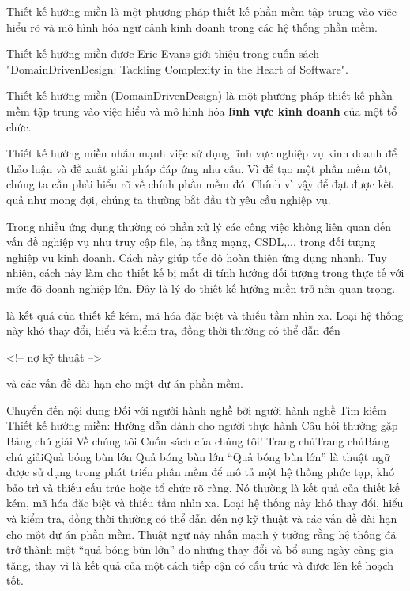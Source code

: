 Thiết kế hướng miền là một phương pháp thiết kế phần mềm tập trung vào việc hiểu rõ và mô hình hóa ngữ cảnh kinh doanh trong các hệ thống phần mềm.

Thiết kế hướng miền được Eric Evans giới thiệu trong cuốn sách "DomainDrivenDesign: Tackling Complexity in the Heart of Software".

Thiết kế hướng miền (DomainDrivenDesign) là một phương pháp thiết kế phần mềm tập trung vào việc hiểu và mô hình hóa \textbf{lĩnh vực kinh doanh} của một tổ chức.

Thiết kế hướng miền nhấn mạnh việc sử dụng lĩnh vực nghiệp vụ kinh doanh để thảo luận và đề xuất giải pháp đáp ứng nhu cầu. Vì để tạo một phần mềm tốt, chúng ta cần phải hiểu rõ về chính phần mềm đó. Chính vì vậy để đạt được kết quả như mong đợi, chúng ta thường bắt đầu từ yêu cầu nghiệp vụ.

Trong nhiều ứng dụng thường có phần xử lý các công việc không liên quan đến vấn đề nghiệp vụ như truy cập file, hạ tầng mạng, CSDL,... trong đối tượng nghiệp vụ kinh doanh. Cách này giúp tốc độ hoàn thiện ứng dụng nhanh. Tuy nhiên, cách này làm cho thiết kế bị mất đi tính hướng đối tượng trong thực tế với mức độ doanh nghiệp lớn. Đây là lý do thiết kế hướng miền trở nên quan trọng.





là kết quả của thiết kế kém, mã hóa đặc biệt và thiếu tầm nhìn xa.
Loại hệ thống này khó thay đổi, hiểu và kiểm tra, đồng thời thường có thể dẫn đến

<!-- nợ kỹ thuật -->

và các vấn đề dài hạn cho một dự án phần mềm.

Chuyển đến nội dung
Đối với người hành nghề bởi người hành nghề
Tìm kiếm
Thiết kế hướng miền: Hướng dẫn dành cho người thực hành
Câu hỏi thường gặp
Bảng chú giải
Về chúng tôi
Cuốn sách của chúng tôi!
Trang chủTrang chủBảng chú giảiQuả bóng bùn lớn
Quả bóng bùn lớn
“Quả bóng bùn lớn” là thuật ngữ được sử dụng trong phát triển phần mềm để mô tả một hệ thống phức tạp, khó bảo trì và thiếu cấu trúc hoặc tổ chức rõ ràng. Nó thường là kết quả của thiết kế kém, mã hóa đặc biệt và thiếu tầm nhìn xa. Loại hệ thống này khó thay đổi, hiểu và kiểm tra, đồng thời thường có thể dẫn đến nợ kỹ thuật và các vấn đề dài hạn cho một dự án phần mềm. Thuật ngữ này nhấn mạnh ý tưởng rằng hệ thống đã trở thành một “quả bóng bùn lớn” do những thay đổi và bổ sung ngày càng gia tăng, thay vì là kết quả của một cách tiếp cận có cấu trúc và được lên kế hoạch tốt.

